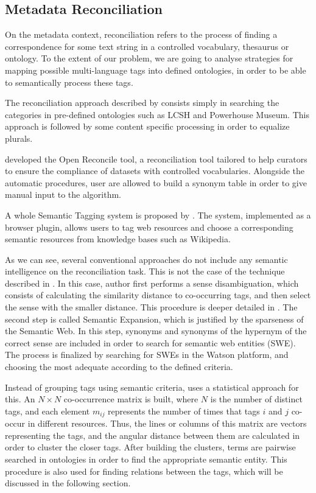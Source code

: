 \subsection{Metadata Reconciliation}
\label{sec:metadata_reconciliation}

On the metadata context, reconciliation refers to the process of finding a correspondence for some text string in a controlled vocabulary, thesaurus or ontology.
To the extent of our problem, we are going to analyse strategies for mapping possible multi-language tags into defined ontologies, in order to be able to semantically process these tags.

The reconciliation approach described by  consists simply in searching the categories in pre-defined ontologies such as LCSH and Powerhouse Museum.
This approach is followed by some content specific processing in order to equalize plurals. 

 developed the Open Reconcile tool, a reconciliation tool tailored to help curators to ensure the compliance of datasets with controlled vocabularies.
Alongside the automatic procedures, user are allowed to build a synonym table in order to give manual input to the algorithm.

A whole Semantic Tagging system is proposed by .
The system, implemented as a browser plugin, allows users to tag web resources and choose a corresponding semantic resources from knowledge bases such as Wikipedia.

As we can see, several conventional approaches do not include any semantic intelligence on the reconciliation task.
This is not the case of the technique described in .
In this case, author first performs a sense disambiguation, which consists of calculating the similarity distance to co-occurring tags, and then select the sense with the smaller distance.
This procedure is deeper detailed in .
The second step is called Semantic Expansion, which is justified by the sparseness of the Semantic Web.
In this step, synonyms and synonyms of the hypernym of the correct sense are included in order to search for semantic web entities (SWE).
The process is finalized by searching for SWEs in the Watson platform, and choosing the most adequate according to the defined criteria.

Instead of grouping tags using semantic criteria,  uses a statistical approach for this.
An $N \times N$ co-occurrence matrix is built, where $N$ is the number of distinct tags, and each element $m_{ij}$ represents the number of times that tags $i$ and $j$ co-occur in different resources.
Thus, the lines or columns of this matrix are vectors representing the tags, and the angular distance between them are calculated in order to cluster the closer tags.
After building the clusters, terms are pairwise searched in ontologies in order to find the appropriate semantic entity.
This procedure is also used for finding relations between the tags, which will be discussed in the following section.

